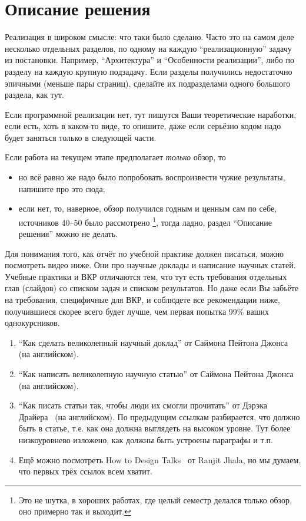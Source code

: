 
\section{Описание решения}
Реализация в широком смысле: что таки было сделано.
Часто это на самом деле несколько отдельных разделов, по одному на каждую \enquote{реализационную} задачу из постановки.
Например, \enquote{Архитектура} и \enquote{Особенности реализации}, либо по разделу на каждую крупную подзадачу.
Если разделы получились недостаточно эпичными (меньше пары страниц), сделайте их подразделами одного большого раздела, как тут.

Если программной реализации нет, тут пишутся Ваши теоретические наработки, если есть, хоть в каком-то виде, то опишите, даже если серьёзно кодом надо будет заняться только в следующей части.

Если работа на текущем этапе предполагает \emph{только} обзор, то
\begin{itemize}
    \item но всё равно же надо было попробовать воспроизвести чужие результаты, напишите про это сюда;
    \item если нет, то, наверное, обзор получился годным и ценным сам по себе, источников 40--50 было рассмотрено%
          \footnote{Это не шутка, в хороших работах, где целый семестр делался только обзор, оно примерно так и выходит.},
          тогда ладно, раздел \enquote{Описание решения} можно не делать.
\end{itemize}

Для понимания того, как отчёт по учебной практике должен писаться, можно посмотреть видео ниже.
Они про научные доклады и написание научных статей.
Учебные практики и ВКР отличаются тем, что тут есть требования отдельных глав (слайдов) со списком задач и списком результатов.
Но даже если Вы забьёте на требования, специфичные для ВКР, и соблюдете все рекомендации ниже, получившиеся скорее всего будет лучше, чем первая попытка 99\% ваших однокурсников.

\begin{enumerate}
    \item \enquote{Как сделать великолепный научный доклад} от Саймона Пейтона Джонса~\cite{SPJGreatTalk} (на английском).
    \item \enquote{Как написать великолепную научную статью} от Саймона Пейтона Джонса~\cite{SPJGreatPaper} (на английском).
    \item \enquote{Как писать статьи так, чтобы люди их смогли прочитать} от Дэрэка Драйера~\cite{DreyerYoutube2020} (на английском).
          По предыдущим ссылкам разбирается, что должно быть в статье, т.е. как она должна выгля\-деть на высоком уровне.
          Тут более низкоуровнево изложено, как должны быть устроены параграфы и т.п.
    \item Ещё можно посмотреть How to Design Talks~\cite{JhalaYoutube2020} от Ranjit Jhala, но мы думаем, что первых трёх ссылок всем хватит.
\end{enumerate}

